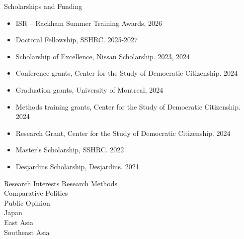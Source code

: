 \documentclass{resume} %
\begin{document}
\begin{rSection}{Scholarships and Funding}
	\begin{itemize}
		\item ISR -- Rackham Summer Training Awards, 2026
		\item Doctoral Fellowship, SSHRC. 2025-2027
		\item Scholarship of Excellence, Nissan Scholarship. 2023, 2024
		\item Conference grants, Center for the Study of Democratic Citizenship. 2024
		\item Graduation grants, University of Montreal, 2024
		\item Methods training grants, Center for the Study of Democratic Citizenship. 2024
		\item Research Grant, Center for the Study of Democratic Citizenship. 2024
		\item Master's Scholarship, SSHRC. 2022
		\item Desjardins Scholarship, Desjardins. 2021
	\end{itemize}

\end{rSection}

\begin{rSection}{Research Interests}
	Research Methods
	\\ Comparative Politics
	\\ Public Opinion
	\\ Japan
	\\ East Asia
	\\ Southeast Asia
\end{rSection}

\end{document}
